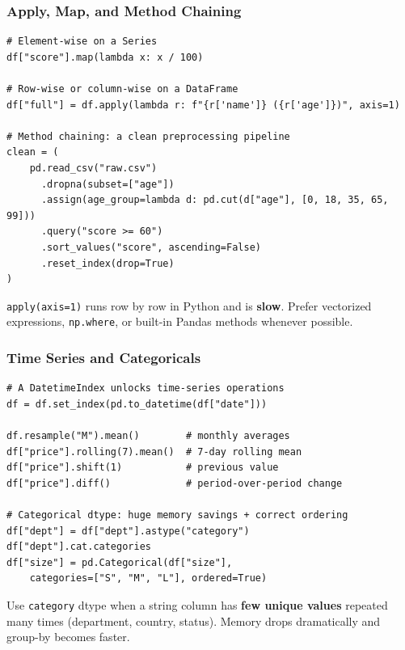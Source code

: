 \documentclass[aspectratio=169,10pt]{beamer}
\newcommand{\keyword}[1]{\textcolor{PrimaryBlue}{\textbf{#1}}}
\newcommand{\codeword}[1]{\texttt{#1}}
\newenvironment{bluebox}[1]{%
  \vspace{0.08cm}\begin{tcolorbox}[lecturebox,title={#1},fontupper=\small]%
}{\end{tcolorbox}\vspace{0.05cm}}
\begin{document}
\begin{frame}[fragile]
\frametitle{Apply, Map, and Method Chaining}
\small
\begin{lstlisting}[style=pycode]
# Element-wise on a Series
df["score"].map(lambda x: x / 100)

# Row-wise or column-wise on a DataFrame
df["full"] = df.apply(lambda r: f"{r['name']} ({r['age']})", axis=1)

# Method chaining: a clean preprocessing pipeline
clean = (
    pd.read_csv("raw.csv")
      .dropna(subset=["age"])
      .assign(age_group=lambda d: pd.cut(d["age"], [0, 18, 35, 65, 99]))
      .query("score >= 60")
      .sort_values("score", ascending=False)
      .reset_index(drop=True)
)
\end{lstlisting}

\begin{bluebox}{Performance reminder}
\codeword{apply(axis=1)} runs row by row in Python and is \keyword{slow}. Prefer vectorized expressions, \codeword{np.where}, or built-in Pandas methods whenever possible.
\end{bluebox}
\end{frame}


\begin{frame}[fragile]
\frametitle{Time Series and Categoricals}
\small
\begin{lstlisting}[style=pycode]
# A DatetimeIndex unlocks time-series operations
df = df.set_index(pd.to_datetime(df["date"]))

df.resample("M").mean()        # monthly averages
df["price"].rolling(7).mean()  # 7-day rolling mean
df["price"].shift(1)           # previous value
df["price"].diff()             # period-over-period change

# Categorical dtype: huge memory savings + correct ordering
df["dept"] = df["dept"].astype("category")
df["dept"].cat.categories
df["size"] = pd.Categorical(df["size"],
    categories=["S", "M", "L"], ordered=True)
\end{lstlisting}

\begin{tcolorbox}[lecturebox,title=When to use categoricals]
Use \codeword{category} dtype when a string column has \keyword{few unique values} repeated many times (department, country, status). Memory drops dramatically and group-by becomes faster.
\end{tcolorbox}
\end{frame}
\end{document}
